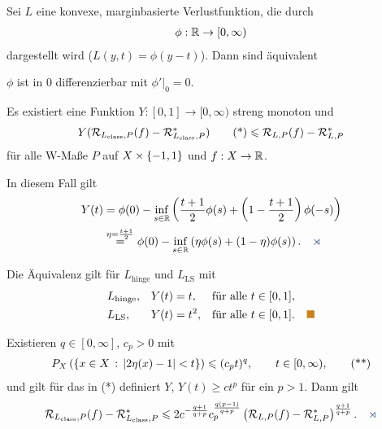 \begin{prop}
\label{prop:7.1}
Sei $L$ eine konvexe, marginbasierte Verlustfunktion, die durch
\begin{align*}
\phi: \mathbb{R}\to [0,\infty)  
\end{align*}
dargestellt wird ($L(y,t) = \phi(y-t)$). Dann sind äquivalent
\begin{equivenum}
\item $\phi$ ist in $0$ differenzierbar mit $\phi'\big|_0 = 0$.
\item Es existiert eine Funktion $Y: [0,1]\to [0,\infty)$ streng monoton und
\begin{align*}
Y(\mathcal{R}_{L_\mathrm{class},P}(f)-\mathcal{R}_{L_\mathrm{class},P}^*)\tag{*}
\leqslant \mathcal{R}_{L,P}(f)-\mathcal{R}_{L,P}^*
\end{align*}
für alle W-Maße $P$ auf $X\times \left\{ -1,1 \right\}$ und $f: X\to \mathbb{R}$.

In diesem Fall gilt
\begin{align*}
Y(t) &= \phi(0) - \inf_{s\in\R}
\left(\frac{t+1}{2}\phi(s) + \left(1-\frac{t+1}{2}\right)\phi(-s) \right)\\
&\overset{\eta = \frac{t+1}{2}}{=}
\phi(0) - \inf_{s\in\R} \left(\eta \phi(s) + (1-\eta)\phi(s) \right).\fishhere 
\end{align*} 
\end{equivenum}
\end{prop}

\begin{bsp*}
Die Äquivalenz gilt für $L_\mathrm{hinge}$ und $L_\mathrm{LS}$ mit 
\begin{align*}
&L_\mathrm{hinge}, && Y(t) = t, && \text{für alle } t\in [0,1],\\
&L_\mathrm{LS}, && Y(t) = t^2, && \text{für alle }t\in [0,1].\bsphere
\end{align*}
\end{bsp*}

\begin{prop*}
Existieren $q\in [0,\infty]$, $c_p > 0$ mit
\begin{align*}
P_X\left(\left\{ x\in X\,:\,\left|2\eta(x)-1\right| < t\right\}\right)
\leqslant (c_p t)^q,\qquad t\in [0,\infty),\tag{**}
\end{align*}
und gilt für das in (*) definiert $Y$, $Y(t) \ge ct^p$ für ein $p>1$. Dann gilt
\begin{align*}
\RR_{L_\mathrm{class},P}(f)-\RR_{L_\mathrm{class},P}^*
\le 2c^{-\frac{q+1}{q+p}} c_p^{\frac{q(p-1)}{q+p}}\left(\RR_{L,P}(f)-\RR_{L,P}^*
\right)^{\frac{q+1}{q+p}}.\fishhere
\end{align*}
\end{prop*}

